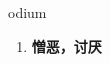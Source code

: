 
\begin{frame}
{\huge odium}
\begin{center}
\begin{enumerate}\Large
  \item \textbf{憎恶，讨厌}
\end{enumerate}
\end{center}
\end{frame}
